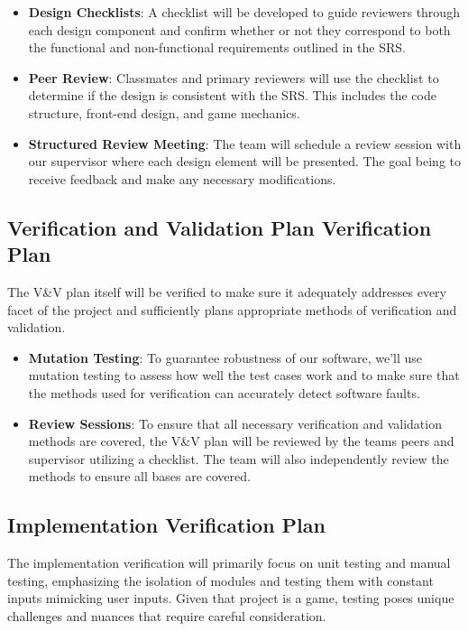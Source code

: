 \documentclass[12pt, titlepage]{article}
\begin{document}
\begin{itemize}
    \item \textbf{Design Checklists}:  A checklist will be developed to guide reviewers through each design component and confirm whether or not they correspond to both the functional and non-functional requirements outlined in the SRS.
    \item \textbf{Peer Review}: Classmates and primary reviewers will use the checklist to determine if the design is consistent with the SRS. This includes the code structure, front-end design, and game mechanics. 
    \item \textbf{Structured Review Meeting}: The team will schedule a review session with our supervisor where each design element will be presented. The goal being to receive feedback and make any necessary modifications. 
\end{itemize}

\subsection{Verification and Validation Plan Verification Plan}

\noindent The V\&V plan itself will be verified to make sure it adequately addresses every facet of the project and sufficiently plans appropriate methods of verification and validation.

\begin{itemize}
  \item \textbf{Mutation Testing}: To guarantee robustness of our software, we'll use mutation testing to assess how well the test cases work and to make sure that the methods used for verification can accurately detect software faults.
  \item \textbf{Review Sessions}: To ensure that all necessary verification and validation methods are covered, the V\&V plan will be reviewed by the teams peers and supervisor utilizing a checklist. The team will also independently review the methods to ensure all bases are covered.
\end{itemize}

\subsection{Implementation Verification Plan}

\noindent The implementation verification will primarily focus on unit testing and manual testing, emphasizing the isolation of modules and testing them with constant inputs mimicking user inputs. Given that project is a game, testing poses unique challenges and nuances that require careful consideration.
\end{document}
